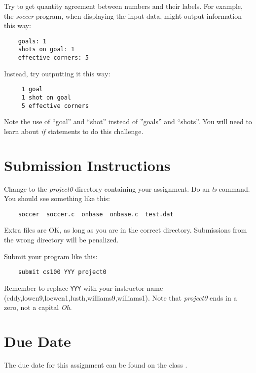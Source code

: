 \documentclass[12pt]{article}
\begin{document}
Try to get quantity agreement between numbers and their labels. For
example, the {\it soccer} program, when displaying the input data,
might output information this way:

\begin{verbatim}
    goals: 1
    shots on goal: 1
    effective corners: 5
\end{verbatim}

Instead, try outputting it this way:

\begin{verbatim}
     1 goal
     1 shot on goal
     5 effective corners
\end{verbatim}

Note the use of ``goal'' and ``shot'' instead of ''goals'' and 
``shots''.
You will need to learn about {\it if} statements to do this challenge.

\section*{Submission Instructions}

Change to the {\it project0} directory containing your assignment.  Do an
{\it ls} command. You should see something like this:

\begin{verbatim}
    soccer  soccer.c  onbase  onbase.c  test.dat
\end{verbatim}

Extra files are OK, as long as you are in the correct directory. 
Submissions from the wrong directory
will be penalized.

Submit your program like this:

\begin{verbatim}
    submit cs100 YYY project0
\end{verbatim}

Remember to replace \verb!YYY! with your instructor name
(eddy,lowen9,loewen1,lusth,williams9,williams1).
Note that {\it project0} ends in a zero, not a capital {\it Oh}.

\section*{Due Date}

The due date for this assignment can be found on the class
.
\end{document}
